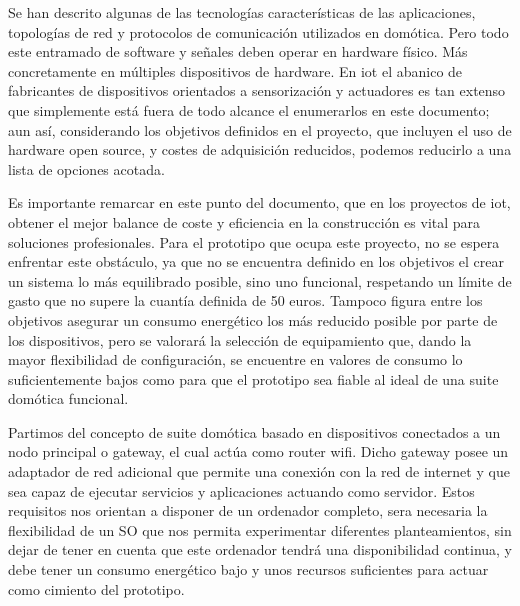 Se han descrito algunas de las tecnologías características de las aplicaciones, topologías de red y protocolos de comunicación utilizados en domótica. Pero todo este entramado de software y señales deben operar en hardware físico. Más concretamente en múltiples dispositivos de hardware. En \gls{iot} el abanico de fabricantes de dispositivos orientados a sensorización y actuadores es tan extenso que simplemente está fuera de todo alcance el enumerarlos en este documento; aun así, considerando los objetivos definidos en el proyecto, que incluyen el uso de hardware open source, y costes de adquisición reducidos, podemos reducirlo a una lista de opciones acotada.

\vspace{1cm}

Es importante remarcar en este punto del documento, que en los proyectos de \gls{iot}, obtener el mejor balance de coste y eficiencia en la construcción es vital para soluciones profesionales. Para el prototipo que ocupa este proyecto, no se espera enfrentar este obstáculo, ya que no se encuentra definido en los objetivos el crear un sistema lo más equilibrado posible, sino uno funcional, respetando un límite de gasto que no supere la cuantía definida de 50 euros. Tampoco figura entre los objetivos asegurar un consumo energético los más reducido posible por parte de los dispositivos, pero se valorará la selección de equipamiento que, dando la mayor flexibilidad de configuración, se encuentre en valores de consumo lo suficientemente bajos como para que el prototipo sea fiable al ideal de una suite domótica funcional.

\vspace{1cm}

Partimos del concepto de suite domótica basado en dispositivos conectados a un nodo principal o \gls{gateway}, el cual actúa como router \gls{wifi}. Dicho \gls{gateway} posee un adaptador de red adicional que permite una conexión con la red de internet y que sea capaz de ejecutar servicios y aplicaciones actuando como servidor. Estos requisitos nos orientan a disponer de un ordenador completo, sera necesaria la flexibilidad de un SO que nos permita experimentar diferentes planteamientos, sin dejar de tener en cuenta que este ordenador tendrá una disponibilidad continua, y debe tener un consumo energético bajo y unos recursos suficientes para actuar como cimiento del prototipo.

\vspace{1cm}

